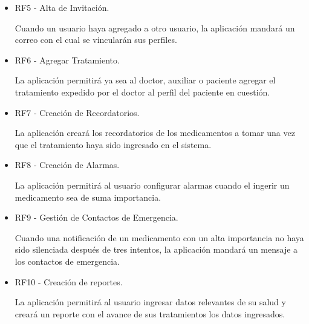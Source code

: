 \begin{itemize}
		\item RF5 - Alta de Invitación.
		
		Cuando un usuario haya agregado a otro usuario, la aplicación mandará un correo con el cual se vincularán sus perfiles.
		
		\item RF6 - Agregar Tratamiento.
		
		La aplicación permitirá  ya sea al doctor, auxiliar o paciente agregar el tratamiento expedido por el doctor al perfil del paciente en cuestión.
		
		\item RF7 - Creación de Recordatorios.
		
		La aplicación creará los recordatorios de los medicamentos a tomar  una vez que el tratamiento haya sido ingresado en el sistema.
		
		\item RF8 - Creación de Alarmas.
		
		La aplicación permitirá al usuario configurar alarmas cuando el ingerir un medicamento sea de suma importancia.
		
		\item RF9 - Gestión de Contactos de Emergencia.
		
		Cuando una notificación de un medicamento con un alta importancia no haya sido silenciada después de tres intentos, la aplicación mandará un mensaje a los contactos de emergencia.
		
		\item RF10 - Creación de reportes.
		
		La aplicación permitirá al usuario ingresar datos relevantes de su salud y creará un reporte con el avance de sus tratamientos los datos ingresados.
\end{itemize}


